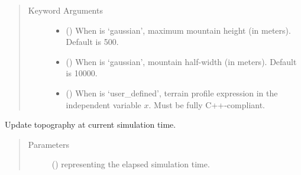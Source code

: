 \documentclass[letterpaper,10pt,english]{sphinxmanual}
\begin{document}
\begin{fulllineitems}
\begin{fulllineitems}
\begin{quote}
\begin{description}
\item[{Keyword Arguments}] \leavevmode\begin{itemize}
\item {} 
 () \textendash{} When  is ‘gaussian’, maximum mountain height (in meters). Default is 500.

\item {} 
 () \textendash{} When  is ‘gaussian’, mountain half-width (in meters). Default is 10000.

\item {} 
 () \textendash{} When  is ‘user\_defined’, terrain profile expression in the independent variable \(x\).
Must be fully C++-compliant.

\end{itemize}

\end{description}\end{quote}

\end{fulllineitems}


\begin{fulllineitems}
\label{\detokenize{api:grids.topography.Topography1d.update}}
Update topography at current simulation time.
\begin{quote}\begin{description}
\item[{Parameters}] \leavevmode
{} () \textendash{}  representing the elapsed simulation time.

\end{description}\end{quote}

\end{fulllineitems}


\end{fulllineitems}

\end{document}
